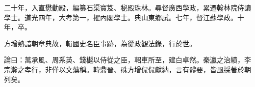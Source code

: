 \begin{pinyinscope}
二十年，入直懋勤殿，編纂石渠寶笈、秘殿珠林。尋督廣西學政，累遷翰林院侍讀學士。道光四年，大考第一，擢內閣學士。典山東鄉試。七年，督江蘇學政。十年，卒。

方增熟諳朝章典故，輯國史名臣事跡，為從政觀法錄，行於世。

論曰：萬承風、周系英、錢樾以侍從之臣，軺車所至，建白卓然。秦瀛之治績，李宗瀚之孝行，非僅以文藻稱。韓鼎晉、硃方增侃侃獻納，言有體要，皆風採著於朝列矣。


\end{pinyinscope}